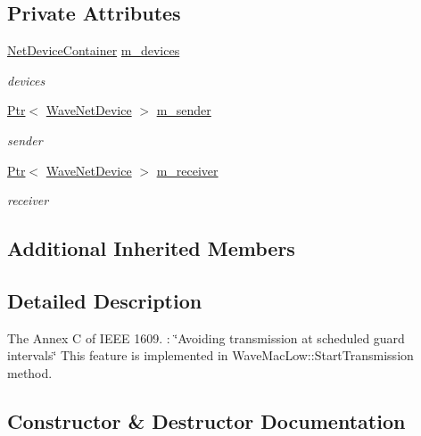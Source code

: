 \subsection*{Private Attributes}
\begin{DoxyCompactItemize}
\item 
\hyperlink{classns3_1_1NetDeviceContainer}{Net\+Device\+Container} \hyperlink{classAnnexC__TestCase_ab2a998e7df6d23c77fd3a06e203ab925}{m\+\_\+devices}
\begin{DoxyCompactList}\small\item\em devices \end{DoxyCompactList}\item 
\hyperlink{classns3_1_1Ptr}{Ptr}$<$ \hyperlink{classns3_1_1WaveNetDevice}{Wave\+Net\+Device} $>$ \hyperlink{classAnnexC__TestCase_a277f353900b6dbe1e7850814b9f26cdb}{m\+\_\+sender}
\begin{DoxyCompactList}\small\item\em sender \end{DoxyCompactList}\item 
\hyperlink{classns3_1_1Ptr}{Ptr}$<$ \hyperlink{classns3_1_1WaveNetDevice}{Wave\+Net\+Device} $>$ \hyperlink{classAnnexC__TestCase_a510f45570e19a81906b9de2c586b89f7}{m\+\_\+receiver}
\begin{DoxyCompactList}\small\item\em receiver \end{DoxyCompactList}\end{DoxyCompactItemize}
\subsection*{Additional Inherited Members}


\subsection{Detailed Description}
The Annex C of I\+E\+EE 1609. \+: \char`\"{}\+Avoiding transmission at scheduled guard intervals\char`\"{} This feature is implemented in Wave\+Mac\+Low\+::\+Start\+Transmission method. 

\subsection{Constructor \& Destructor Documentation}

